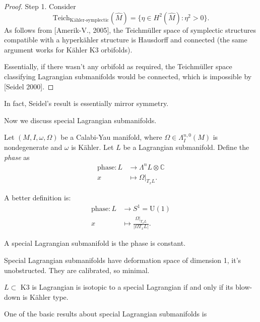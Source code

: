 \begin{proof}
\noindent
Step 1. Consider 
$$
\text{Teich}_{\text{Kähler-symplectic}}(\hat{M})
=\{\eta \in H^{2}(\hat{M}):\eta^2>0\}.
$$
As follows from [Amerik-V., 2005], the
Teichmüller space of symplectic structures compatible
with a hyperkähler structure is Hausdorff and connected
(the same argument works for Kähler K3 orbifolds).

Essentially, if there wasn't any orbifold
as required, the Teichmüller space classifying
Lagrangian submanifolds would be connected, which
is impossible by [Seidel 2000].
\end{proof}

\noindent
In fact, Seidel's result is essentially mirror symmetry.

\medskip\noindent
Now we discuss special Lagrangian submanifolds.

\begin{definition}
\label{definition-phase}
Let $(M,I,\omega,\Omega)$ be a Calabi-Yau manifold, where
$\Omega \in \Lambda^{n,0}_I(M)$ is nondegenerate and $\omega$ is Kähler.
Let $L$ be a Lagrangian submanifold.
Define the {\it phase} as
\begin{align*}
\text{phase}: L &\longrightarrow \Lambda^nL \otimes \mathbb{C} \\
x &\longmapsto \Omega|_{T_xL}.
\end{align*}
\end{definition}

\noindent
A better definition is:
\begin{align*}
\text{phase}: L &\longrightarrow S^1=\text{U}(1) \\
x &\longmapsto \frac{\Omega|_{T_xL}}{|\Omega T_xL|}.
\end{align*}

\begin{definition}
\label{definition-special-lagrangian}
A special Lagrangian submanifold is the phase is constant.
\end{definition}

\noindent
Special Lagrangian submanifolds have deformation space of
dimension 1, it's unobstructed. They are calibrated, so minimal.

\begin{theorem}
\label{theorem-lagrangians-of-k3}
$L \subset$ K3 is Lagrangian is isotopic to a special Lagrangian
if and only if its blow-down is Kähler type.
\end{theorem}

\medskip\noindent
One of the basic results about special Lagrangian
submanifolds is

